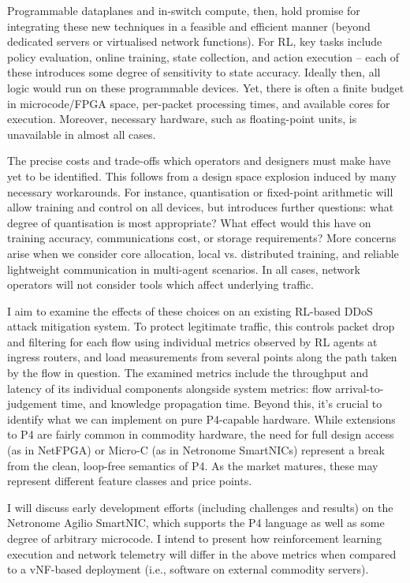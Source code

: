 \documentclass[sigconf,natbib=false]{acmart}
\begin{document}
Programmable dataplanes and in-switch compute, then, hold promise for integrating these new techniques in a feasible and efficient manner (beyond dedicated servers or virtualised network functions). For RL, key tasks include policy evaluation, online training, state collection, and action execution -- each of these introduces some degree of sensitivity to state accuracy. Ideally then, all logic would run on these programmable devices. Yet, there is often a finite budget in microcode/FPGA space, per-packet processing times, and available cores for execution. Moreover, necessary hardware, such as floating-point units, is unavailable in almost all cases.

The precise costs and trade-offs which operators and designers must make have yet to be identified. This follows from a design space explosion induced by many necessary workarounds. For instance, quantisation or fixed-point arithmetic will allow training and control on all devices, but introduces further questions: what degree of quantisation is most appropriate? What effect would this have on training accuracy, communications cost, or storage requirements? More concerns arise when we consider core allocation, local vs. distributed training, and reliable lightweight communication in multi-agent scenarios. In all cases, network operators will not consider tools which affect underlying traffic.

I aim to examine the effects of these choices on an existing RL-based DDoS attack mitigation system. To protect legitimate traffic, this controls packet drop and filtering for each flow using individual metrics observed by RL agents at ingress routers, and load measurements from several points along the path taken by the flow in question. The examined metrics include the throughput and latency of its individual components alongside system metrics: flow arrival-to-judgement time, and knowledge propagation time. Beyond this, it's crucial to identify what we can implement on pure P4-capable hardware. While extensions to P4 are fairly common in commodity hardware, the need for full design access (as in NetFPGA) or Micro-C (as in Netronome SmartNICs) represent a break from the clean, loop-free semantics of P4. As the market matures, these may represent different feature classes and price points.

I will discuss early development efforts (including challenges and results) on the Netronome Agilio SmartNIC, which supports the P4 language as well as some degree of arbitrary microcode. I intend to present how reinforcement learning execution and network telemetry will differ in the above metrics when compared to a vNF-based deployment (i.e., software on external commodity servers).
\end{document}

